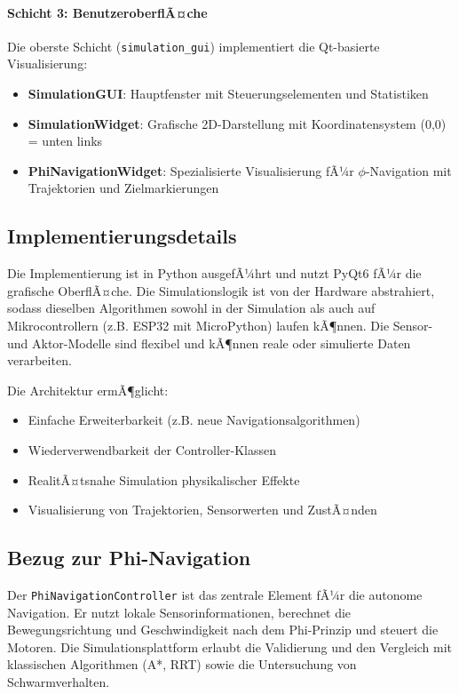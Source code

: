 ﻿\documentclass[a4paper,12pt]{article}
\theoremstyle{definition}
\begin{document}
\paragraph{Schicht 3: BenutzeroberflÃ¤che}

Die oberste Schicht (\texttt{simulation\_gui}) implementiert die Qt-basierte Visualisierung:

\begin{itemize}
	\item \textbf{SimulationGUI}: Hauptfenster mit Steuerungselementen und Statistiken
	\item \textbf{SimulationWidget}: Grafische 2D-Darstellung mit Koordinatensystem (0,0) = unten links
	\item \textbf{PhiNavigationWidget}: Spezialisierte Visualisierung fÃ¼r $\phi$-Navigation mit Trajektorien und Zielmarkierungen
\end{itemize}

\subsection{Implementierungsdetails}

Die Implementierung ist in Python ausgefÃ¼hrt und nutzt PyQt6 fÃ¼r die grafische OberflÃ¤che. Die Simulationslogik ist von der Hardware abstrahiert, sodass dieselben Algorithmen sowohl in der Simulation als auch auf Mikrocontrollern (z.B. ESP32 mit MicroPython) laufen kÃ¶nnen. Die Sensor- und Aktor-Modelle sind flexibel und kÃ¶nnen reale oder simulierte Daten verarbeiten.

Die Architektur ermÃ¶glicht:
\begin{itemize}
	\item[-] Einfache Erweiterbarkeit (z.B. neue Navigationsalgorithmen)
	\item[-] Wiederverwendbarkeit der Controller-Klassen
	\item[-] RealitÃ¤tsnahe Simulation physikalischer Effekte
	\item[-] Visualisierung von Trajektorien, Sensorwerten und ZustÃ¤nden
\end{itemize}

\subsection{Bezug zur Phi-Navigation}

Der \texttt{PhiNavigationController} ist das zentrale Element fÃ¼r die autonome Navigation. Er nutzt lokale Sensorinformationen, berechnet die Bewegungsrichtung und Geschwindigkeit nach dem Phi-Prinzip und steuert die Motoren. Die Simulationsplattform erlaubt die Validierung und den Vergleich mit klassischen Algorithmen (A*, RRT) sowie die Untersuchung von Schwarmverhalten.
\end{document}
